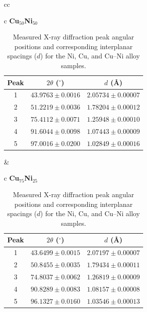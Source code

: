 \documentclass[12pt]{article}
\begin{document}
\begin{table}[H]
\begin{tabular}{cc}
\begin{tabular}{c}
\textbf{Cu$_{50}$Ni$_{50}$}\\[-2pt]
\begin{tabular}{ccc}
\hline
Peak & $2\theta$ ($^\circ$) & $d$ (\AA)\\
\hline
1 & $43.9763 \pm 0.0016$ & $2.05734 \pm 0.00007$\\
2 & $51.2219 \pm 0.0036$ & $1.78204 \pm 0.00012$\\
3 & $75.4112 \pm 0.0071$ & $1.25948 \pm 0.00010$\\
4 & $91.6044 \pm 0.0098$ & $1.07443 \pm 0.00009$\\
5 & $97.0016 \pm 0.0200$ & $1.02849 \pm 0.00016$\\
\hline
\end{tabular}
\end{tabular}
&
\begin{tabular}{c}
\textbf{Cu$_{75}$Ni$_{25}$}\\[-2pt]
\begin{tabular}{ccc}
\hline
Peak & $2\theta$ ($^\circ$) & $d$ (\AA)\\
\hline
1 & $43.6499 \pm 0.0015$ & $2.07197 \pm 0.00007$\\
2 & $50.8455 \pm 0.0035$ & $1.79434 \pm 0.00011$\\
3 & $74.8037 \pm 0.0062$ & $1.26819 \pm 0.00009$\\
4 & $90.8289 \pm 0.0083$ & $1.08157 \pm 0.00008$\\
5 & $96.1327 \pm 0.0160$ & $1.03546 \pm 0.00013$\\
\hline
\end{tabular}
\end{tabular}

\end{tabular}
\caption{Measured X-ray diffraction peak angular positions and corresponding interplanar spacings ($d$) for the Ni, Cu, and Cu--Ni alloy samples.}
\end{table}
\end{document}
